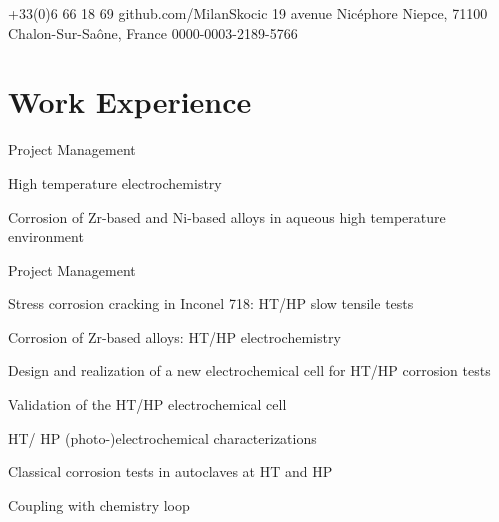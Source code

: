 \documentclass[11pt, a4paper, notitlepage]{article}
\begin{document}
\selectfont
\pagestyle{empty}
		
	
	
	{+33(0)6 66 18 69}
	{github.com/MilanSkocic}
	{19 avenue Nicéphore Niepce, 71100 Chalon-Sur-Saône, France}
	{0000-0003-2189-5766}
	
	
	\section*{Work Experience}
		\begin{jobdetails}
			\item Project Management
			\item High temperature electrochemistry
			\item Corrosion of Zr-based and Ni-based alloys in aqueous high temperature environment
		\end{jobdetails}
		
		\begin{jobdetails}
			\item Project Management
			\item Stress corrosion cracking in Inconel 718: HT/HP slow tensile tests
			\item Corrosion of Zr-based alloys: HT/HP electrochemistry
		\end{jobdetails}

		\begin{jobdetails}
			\item Design and realization of a new electrochemical cell for HT/HP corrosion tests
			\item Validation of the HT/HP electrochemical cell
			\item HT/ HP (photo-)electrochemical characterizations
			\item Classical corrosion tests in autoclaves at HT and HP
			\item Coupling with chemistry loop
		\end{jobdetails}
\end{document}
